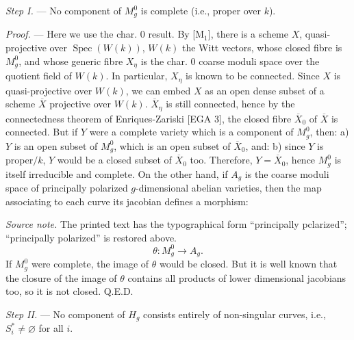 \documentclass[10pt]{article}
\newcommand{\Spec}{\operatorname{Spec}}
\begin{document}
\medskip
\noindent\emph{Step I.} --- No component of $M_g^0$ is complete (i.e., proper over $k$).

\noindent\emph{Proof.} --- Here we use the char. 0 result. By [M$_1$], there is a scheme $X$, quasi-projective over $\Spec(W(k))$, $W(k)$ the Witt vectors, whose closed fibre is $M_g^0$, and whose generic fibre $X_\eta$ is the char. 0 coarse moduli space over the quotient field of $W(k)$. In particular, $X_\eta$ is known to be connected. Since $X$ is quasi-projective over $W(k)$, we can embed $X$ as an open dense subset of a scheme $\overline X$ projective over $W(k)$. $\overline X_\eta$ is still connected, hence by the connectedness theorem of Enriques-Zariski [EGA 3], the closed fibre $\overline X_0$ of $\overline X$ is connected. But if $Y$ were a complete variety which is a component of $M_g^0$, then: a) $Y$ is an open subset of $M_g^0$, which is an open subset of $\overline X_0$, and: b) since $Y$ is proper$/k$, $Y$ would be a closed subset of $\overline X_0$ too. Therefore, $Y=\overline X_0$, hence $M_g^0$ is itself irreducible and complete. On the other hand, if $A_g$ is the coarse moduli space of principally polarized $g$-dimensional abelian varieties, then the map associating to each curve its jacobian defines a morphism:
\par\smallskip
\noindent\emph{Source note.} The printed text has the typographical form ``principally pclarized''; ``principally polarized'' is restored above.
\[
\theta:M_g^0\to A_g.
\]
If $M_g^0$ were complete, the image of $\theta$ would be closed. But it is well known that the closure of the image of $\theta$ contains all products of lower dimensional jacobians too, so it is not closed. Q.E.D.

\medskip
\noindent\emph{Step II.} --- No component of $H_g$ consists entirely of non-singular curves, i.e., $S_i^*\ne\varnothing$ for all $i$.
\end{document}
